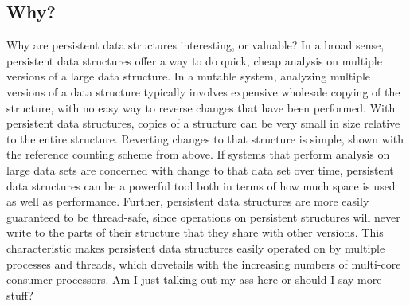 \documentclass[preprint]{sigplanconf}
\begin{document}
\subsection{Why?}
Why are persistent data structures interesting, or valuable?
In a broad sense, persistent data structures offer a way to do quick, cheap analysis on multiple versions of a large data structure.
In a mutable system, analyzing multiple versions of a data structure typically involves expensive wholesale copying of the structure, with no easy way to reverse changes that have been performed.
With persistent data structures, copies of a structure can be very small in size relative to the entire structure.
Reverting changes to that structure is simple, shown with the reference counting scheme from above.
If systems that perform analysis on large data sets are concerned with change to that data set over time, persistent data structures can be a powerful tool both in terms of how much space is used as well as performance.
Further, persistent data structures are more easily guaranteed to be thread-safe, since operations on persistent structures will never write to the parts of their structure that they share with other versions.
This characteristic makes persistent data structures easily operated on by multiple processes and threads, which dovetails with the increasing numbers of multi-core consumer processors.
Am I just talking out my ass here or should I say more stuff?
\end{document}
